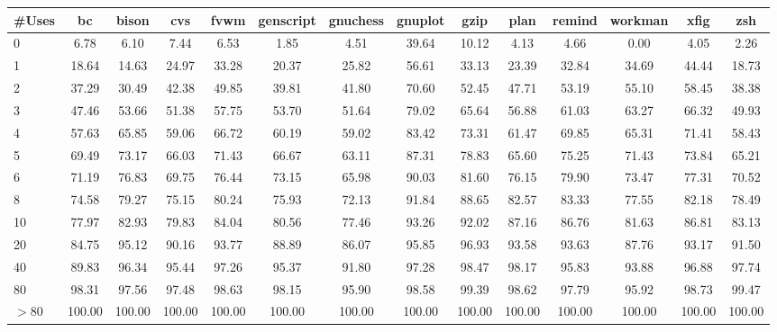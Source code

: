 \begin{tabular}{|l|c|c|c|c|c|c|c|c|c|c|c|c|c|}\hline
\#Uses & bc & bison & cvs & fvwm & genscript & gnuchess & gnuplot & gzip & plan & remind & workman & xfig & zsh\\\hline\hline
0 & 6.78 & 6.10 & 7.44 & 6.53 & 1.85 & 4.51 & 39.64 & 10.12 & 4.13 & 4.66 & 0.00 & 4.05 & 2.26\\\hline
1 & 18.64 & 14.63 & 24.97 & 33.28 & 20.37 & 25.82 & 56.61 & 33.13 & 23.39 & 32.84 & 34.69 & 44.44 & 18.73\\\hline
2 & 37.29 & 30.49 & 42.38 & 49.85 & 39.81 & 41.80 & 70.60 & 52.45 & 47.71 & 53.19 & 55.10 & 58.45 & 38.38\\\hline
3 & 47.46 & 53.66 & 51.38 & 57.75 & 53.70 & 51.64 & 79.02 & 65.64 & 56.88 & 61.03 & 63.27 & 66.32 & 49.93\\\hline
4 & 57.63 & 65.85 & 59.06 & 66.72 & 60.19 & 59.02 & 83.42 & 73.31 & 61.47 & 69.85 & 65.31 & 71.41 & 58.43\\\hline
5 & 69.49 & 73.17 & 66.03 & 71.43 & 66.67 & 63.11 & 87.31 & 78.83 & 65.60 & 75.25 & 71.43 & 73.84 & 65.21\\\hline
6 & 71.19 & 76.83 & 69.75 & 76.44 & 73.15 & 65.98 & 90.03 & 81.60 & 76.15 & 79.90 & 73.47 & 77.31 & 70.52\\\hline
8 & 74.58 & 79.27 & 75.15 & 80.24 & 75.93 & 72.13 & 91.84 & 88.65 & 82.57 & 83.33 & 77.55 & 82.18 & 78.49\\\hline
10 & 77.97 & 82.93 & 79.83 & 84.04 & 80.56 & 77.46 & 93.26 & 92.02 & 87.16 & 86.76 & 81.63 & 86.81 & 83.13\\\hline
20 & 84.75 & 95.12 & 90.16 & 93.77 & 88.89 & 86.07 & 95.85 & 96.93 & 93.58 & 93.63 & 87.76 & 93.17 & 91.50\\\hline
40 & 89.83 & 96.34 & 95.44 & 97.26 & 95.37 & 91.80 & 97.28 & 98.47 & 98.17 & 95.83 & 93.88 & 96.88 & 97.74\\\hline
80 & 98.31 & 97.56 & 97.48 & 98.63 & 98.15 & 95.90 & 98.58 & 99.39 & 98.62 & 97.79 & 95.92 & 98.73 & 99.47\\\hline
$>$80 & 100.00 & 100.00 & 100.00 & 100.00 & 100.00 & 100.00 & 100.00 & 100.00 & 100.00 & 100.00 & 100.00 & 100.00 & 100.00\\\hline
\end{tabular}
